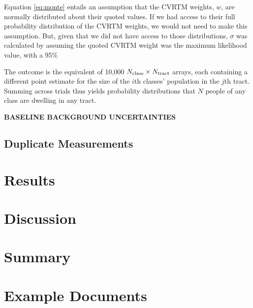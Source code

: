 \documentclass[11pt,twocolumn]{article}
\def\bfr{\bf\color{red}}
\begin{document}
Equation \ref{eq:monte} entails an assumption that the CVRTM weights, $w$, are normally distributed 
about their quoted values. If we had access to their full probability distribution of the CVRTM weights, we 
would not need to make this assumption. But, given that we did not have access to those distributions, $\sigma$
was calculated by assuming the quoted CVRTM weight was the maximum likelihood value, with a 95\%

The outcome is the equivalent of 10,000 $N_{\rm class}\times N_{\rm tract}$ arrays, each containing a different
point estimate for the size of the $i$th classes' population in the $j$th tract. Summing across trials thus
yields probability distributions that $N$ people of any class are dwelling in any tract.

{\bfr BASELINE BACKGROUND UNCERTAINTIES}

\subsection{Duplicate Measurements}
\label{sec:dupes}

\section{Results}
\label{sec:results}

\section{Discussion}
\label{sec:discussion}

\section{Summary}
\label{sec:summary}

\appendix

\section{Example Documents}
\end{document}
